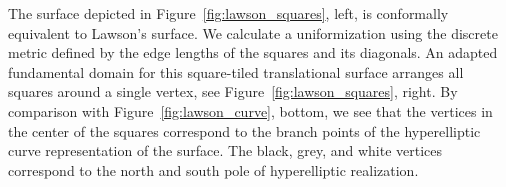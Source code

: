 \documentclass[Thesis]{subfiles}
\begin{document}
The surface depicted in Figure~\ref{fig:lawson_squares}, left, is conformally equivalent to Lawson's surface. We calculate a uniformization using the discrete metric defined by the edge lengths of the squares and its diagonals. An adapted fundamental domain for this square-tiled translational surface arranges all squares around a single vertex, see Figure~\ref{fig:lawson_squares}, right. By comparison with Figure~\ref{fig:lawson_curve}, bottom, we see that the vertices in the center of the squares correspond to the branch points of the hyperelliptic curve representation of the surface. The black, grey, and white vertices correspond to the north and south pole of hyperelliptic realization.

\subfilebibliography

%
%
%
%
\end{document}

